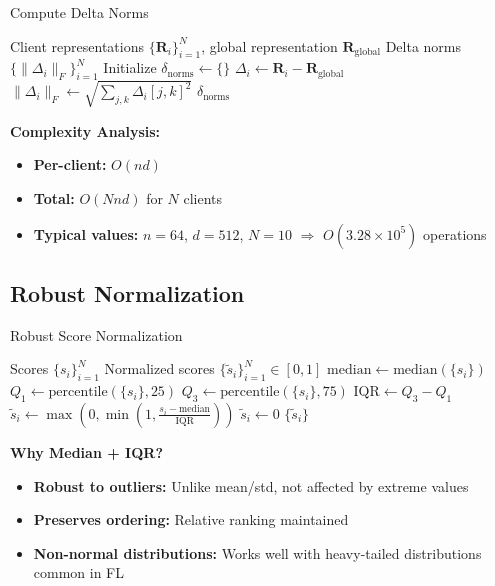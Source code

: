 \documentclass[11pt,a4paper]{article}
\begin{document}
\begin{algorithm}[H]
\caption{Compute Delta Norms}
\label{alg:delta}
\begin{algorithmic}[1]
\Require Client representations $\{\mathbf{R}_i\}_{i=1}^{N}$, global representation $\mathbf{R}_{\text{global}}$
\Ensure Delta norms $\{\|\Delta_i\|_F\}_{i=1}^{N}$
\State Initialize $\delta_{\text{norms}} \leftarrow \{\}$
    \State $\Delta_i \leftarrow \mathbf{R}_i - \mathbf{R}_{\text{global}}$ 
    \State $\|\Delta_i\|_F \leftarrow \sqrt{\sum_{j,k} \Delta_i[j,k]^2}$ 
\EndFor
\State \Return $\delta_{\text{norms}}$
\end{algorithmic}
\end{algorithm}

\textbf{Complexity Analysis:}
\begin{itemize}
    \item \textbf{Per-client:} $O(nd)$
    \item \textbf{Total:} $O(Nnd)$ for $N$ clients
    \item \textbf{Typical values:} $n=64$, $d=512$, $N=10$ $\Rightarrow$ $O(3.28 \times 10^5)$ operations
\end{itemize}

\subsection{Robust Normalization}

\begin{algorithm}[H]
\caption{Robust Score Normalization}
\label{alg:normalize}
\begin{algorithmic}[1]
\Require Scores $\{s_i\}_{i=1}^{N}$
\Ensure Normalized scores $\{\tilde{s}_i\}_{i=1}^{N} \in [0, 1]$
\State $\text{median} \leftarrow \text{median}(\{s_i\})$
\State $Q_1 \leftarrow \text{percentile}(\{s_i\}, 25)$
\State $Q_3 \leftarrow \text{percentile}(\{s_i\}, 75)$
\State $\text{IQR} \leftarrow Q_3 - Q_1$
        \State $\tilde{s}_i \leftarrow \max\left(0, \min\left(1, \frac{s_i - \text{median}}{\text{IQR}}\right)\right)$
    \Else
        \State $\tilde{s}_i \leftarrow 0$
    \EndIf
\EndFor
\State \Return $\{\tilde{s}_i\}$
\end{algorithmic}
\end{algorithm}

\textbf{Why Median + IQR?}
\begin{itemize}
    \item \textbf{Robust to outliers:} Unlike mean/std, not affected by extreme values
    \item \textbf{Preserves ordering:} Relative ranking maintained
    \item \textbf{Non-normal distributions:} Works well with heavy-tailed distributions common in FL
\end{itemize}
\end{document}

